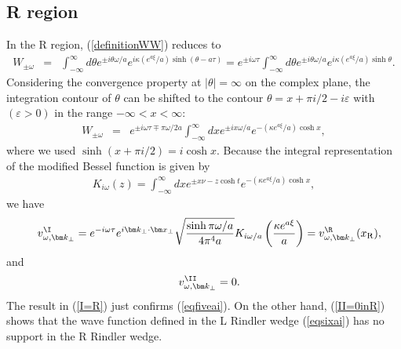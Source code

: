 \documentclass[aps,prd,preprintnumbers,nofootinbib,showpacs]{revtex4}%
\begin{document}
\begin{widetext}
\subsection{R region}
In the R region, (\ref{definitionWW}) reduces to 
\begin{eqnarray}
W_{\pm \omega}&=&\int_{-\infty}^{\infty} {d\theta }e^{\pm i\theta\omega/a} e^{i\kappa (e^{a\xi}/a)\sinh (\theta-a\tau) }
=e^{\pm i\omega\tau}\int_{-\infty}^{\infty} {d\theta }e^{\pm i\theta\omega/a} e^{i\kappa (e^{a\xi}/a)\sinh \theta}.
\label{definitionWR}
\end{eqnarray}
Considering the convergence property at $|\theta|=\infty$ on the complex plane, 
the integration contour of $\theta$ can be shifted to
the contour $\theta= x +\pi i/2-i\varepsilon $ with $(\varepsilon>0)$ 
in the range $-\infty < x < \infty$:
\begin{eqnarray}
W_{\pm \omega}&=&e^{\pm i\omega\tau\mp \pi\omega/2a}\int_{-\infty}^{\infty} {dx }e^{\pm ix\omega/a} 
e^{-(\kappa e^{a\xi}/a)\cosh x} ,
\label{definitionWR2}
\end{eqnarray}
where we used $\sinh(x+\pi i/2)=i\cosh x$. 
Because the integral representation of the modified Bessel function is given by
\begin{eqnarray}
K_{i\omega}(z)=\int_{-\infty}^{\infty} {dx }e^{\pm x\nu-z\cosh t}  
e^{-(\kappa e^{a\xi}/a)\cosh x},
\label{definitionK}
\end{eqnarray}
we have 
\begin{eqnarray}
&&v^{\I}_{\omega,\bm k_\perp}=e^{-i\omega\tau} e^{i\bm k_\perp\cdot \bm x_\perp}\sqrt{\sinh \pi\omega/a \over 4\pi^4 a}
K_{i\omega/a}\left({\kappa e^{a\xi} \over a}\right)=v^{\R}_{\omega,\bm k_\perp}(x_{\rm R}),
\label{I=R}
\end{eqnarray}
and
\begin{eqnarray}
&&v^{\II}_{\omega,\bm k_\perp}=0 .
\label{II=0inR}
\end{eqnarray}
The result in (\ref{I=R}) just confirms (\ref{eqfiveai}).
On the other hand, (\ref{II=0inR}) shows that the wave function defined in the L 
Rindler wedge (\ref{eqsixai}) has no support in the R Rindler wedge.


\end{widetext}
\end{document}
